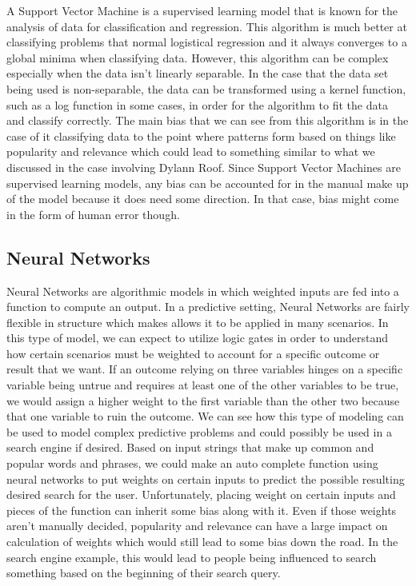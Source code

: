 \documentclass[sigconf]{acmart}
\begin{document}
A Support Vector Machine is a supervised learning model that is known for the analysis of data for classification and regression. This algorithm is much better at classifying problems that normal logistical regression and it always converges to a global minima when classifying data. However, this algorithm can be complex especially when the data isn't linearly separable. In the case that the data set being used is non-separable, the data can be transformed using a kernel function, such as a log function in some cases, in order for the algorithm to fit the data and classify correctly. The main bias that we can see from this algorithm is in the case of it classifying data to the point where patterns form based on things like popularity and relevance which could lead to something similar to what we discussed in the case involving Dylann Roof. Since Support Vector Machines are supervised learning models, any bias can be accounted for in the manual make up of the model because it does need some direction. In that case, bias might come in the form of human error though.

\subsection{Neural Networks}

Neural Networks are algorithmic models in which weighted inputs are fed into a function to compute an output. In a predictive setting, Neural Networks are fairly flexible in structure which makes allows it to be applied in many scenarios. In this type of model, we can expect to utilize logic gates in order to understand how certain scenarios must be weighted to account for a specific outcome or result that we want. If an outcome relying on three variables hinges on a specific variable being untrue and requires at least one of the other variables to be true, we would assign a higher weight to the first variable than the other two because that one variable to ruin the outcome. We can see how this type of modeling can be used to model complex predictive problems and could possibly be used in a search engine if desired. Based on input strings that make up common and popular words and phrases, we could make an auto complete function using neural networks to put weights on certain inputs to predict the possible resulting desired search for the user. Unfortunately, placing weight on certain inputs and pieces of the function can inherit some bias along with it. Even if those weights aren't manually decided, popularity and relevance can have a large impact on calculation of weights which would still lead to some bias down the road. In the search engine example, this would lead to people being influenced to search something based on the beginning of their search query.
\end{document}
